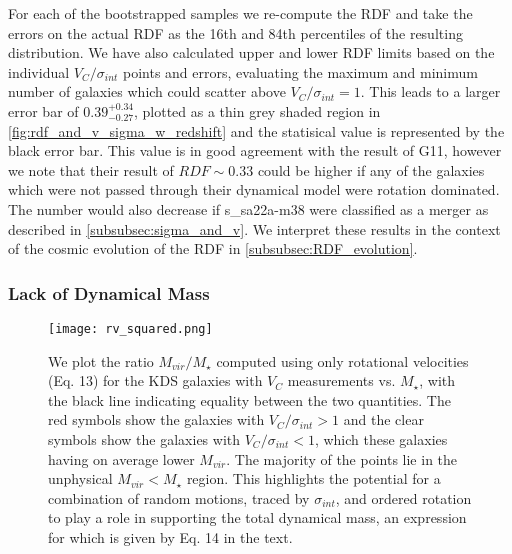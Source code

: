 \documentclass[fleqn,usenatbib]{mn2e}
\begin{document}
For each of the bootstrapped samples we re-compute the RDF and take the errors on the actual RDF as the 16th and 84th percentiles of the resulting distribution.
We have also calculated upper and lower RDF limits based on the individual $V_{C}/\sigma_{int}$ points and errors, evaluating the maximum and minimum number of galaxies which could scatter above $V_{C}/\sigma_{int} = 1$.
This leads to a larger error bar of $0.39^{+0.34}_{-0.27}$, plotted as a thin grey shaded region in \ref{fig:rdf_and_v_sigma_w_redshift} and the statisical value is represented by the black error bar.
This value is in good agreement with the result of G11, however we note that their result of $RDF \sim 0.33$ could be higher if any of the galaxies which were not passed through their dynamical model were rotation dominated.
The number would also decrease if s\_sa22a-m38 were classified as a merger as described in \cref{subsubsec:sigma_and_v}.
We interpret these results in the context of the cosmic evolution of the RDF in \cref{subsubsec:RDF_evolution}.

\subsubsection{Lack of Dynamical Mass}\label{subsubsec:dynamical_masses}

\begin{figure}
\centering
\texttt{[image: rv\_squared.png]}
\caption{We plot the ratio $M_{vir}/M_{\star}$ computed using only rotational velocities (Eq. 13) for the KDS galaxies with $V_{C}$ measurements vs. $M_{\star}$, with the black line indicating equality between the two quantities.
The red symbols show the galaxies with $V_{C}/\sigma_{int} > 1$ and the clear symbols show the galaxies with $V_{C}/\sigma_{int} < 1$, which these galaxies having on average lower $M_{vir}$.
The majority of the points lie in the unphysical $M_{vir} < M_{\star}$ region.
This highlights the potential for a combination of random motions, traced by $\sigma_{int}$, and ordered rotation to play a role in supporting the total dynamical mass, an expression for which is given by Eq. 14 in the text.}
\label{fig:dyn_masses}
\end{figure}
\end{document}
